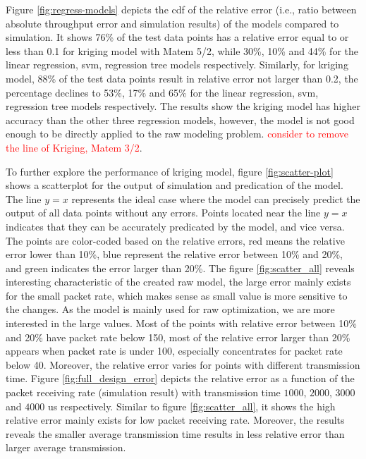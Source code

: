 
Figure \ref{fig:regress-models} depicts the \gls{cdf} of the relative error (i.e., ratio between absolute throughput error and simulation results) of the  models compared to simulation.
It shows 76\% of the test data points has a relative error equal to or less than 0.1 for kriging model with Matem 5/2, while 30\%, 10\% and 44\% for the linear regression, \gls{svm}, regression tree models respectively. Similarly,  for kriging model, 88\% of the test data points result in  relative error not larger than 0.2, the percentage declines to 53\%, 17\% and 65\% for the linear regression, \gls{svm}, regression tree models respectively. The results show the kriging model has higher accuracy than the other three regression models, however, the model is not good enough to be directly applied to the \gls{raw} modeling problem. \textcolor{red}{consider to remove the line of Kriging, Matem 3/2}.


To further explore the performance of kriging model, figure \ref{fig:scatter-plot} 
shows a scatterplot for the output of simulation and predication of the model.
The line  $y=x$ represents the ideal case where the model can precisely predict the output of all data points without any errors. Points located near the line $y=x$ indicates that they can be accurately predicated by the model, and vice versa. The points are color-coded based on the relative errors, red means the relative error lower than 10\%, blue represent the relative error between 10\% and 20\%, and green indicates the error larger than 20\%. The  figure \ref{fig:scatter_all} reveals interesting characteristic of the created \gls{raw} model, the large error mainly exists for the small packet rate, which makes sense as small value is more sensitive to the changes. As the model is mainly used for \gls{raw} optimization, we are more interested in the large values. Most of the points with relative error between 10\% and 20\%  have packet rate below 150, most of the relative error larger than 20\% appears when packet rate is under 100, especially concentrates for packet rate below 40. Moreover, the relative error varies for points with different transmission time. 
Figure \ref{fig:full_design_error} depicts the relative error as a function of the packet receiving rate (simulation result) with transmission time $1000$, $2000$, $3000$ and $4000$ us respectively. Similar to figure  \ref{fig:scatter_all}, it shows the high relative error mainly exists for low packet receiving rate. Moreover, the results reveals the smaller average transmission time results in less relative error than larger average transmission.
 
